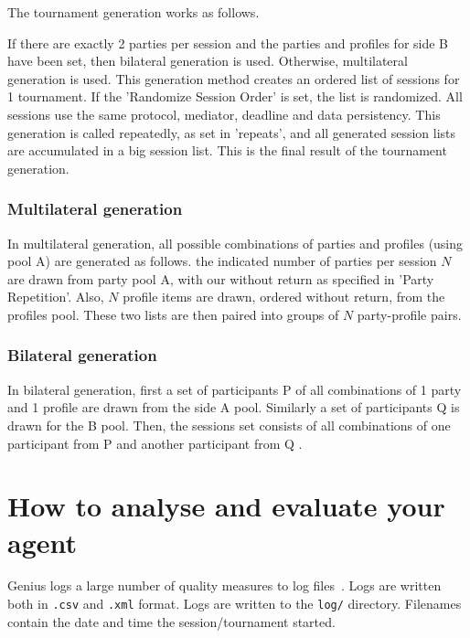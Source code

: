 \documentclass[]{llncs}
\newcommand\Genius{{\sc Genius}}
\begin{document}
The tournament generation works as follows. 

If there are exactly 2 parties per session and the parties and profiles for side B have been set, then bilateral generation is used. Otherwise, multilateral generation is used. This generation method creates an ordered list of sessions for 1 tournament.  If the 'Randomize Session Order' is set, the list is randomized. All sessions use the same protocol, mediator, deadline and data persistency.
This generation is called repeatedly, as set in 'repeats', and all generated session lists are accumulated in a big session list. This is the final result of the  tournament generation.

\subsubsection{Multilateral generation}
In multilateral generation,  all possible combinations of parties and profiles (using pool A) are generated as follows. the indicated number of parties per session $N$ are drawn from party pool A, with our without return as specified in 'Party Repetition'. Also, $N$ profile items are drawn, ordered without return, from the profiles pool. These two lists are then paired into groups of $N$ party-profile pairs. 

\subsubsection{Bilateral generation}
In bilateral generation, first a set of participants P of all combinations of 1 party and 1 profile are drawn from the side A pool. Similarly a set of participants Q is drawn for the B pool. Then, the sessions set consists of all combinations of one participant from P and another participant from Q . 





\section{How to analyse and evaluate your agent}\label{sec:qm}

{\Genius} logs a large number of quality measures to log files~\cite{Baarslag12AI,Baarslag13AIT}. Logs are written both  in \verb|.csv| and \verb|.xml| format.
Logs are written to the \verb|log/| directory. Filenames contain the date and time the session/tournament started. 
\end{document}
